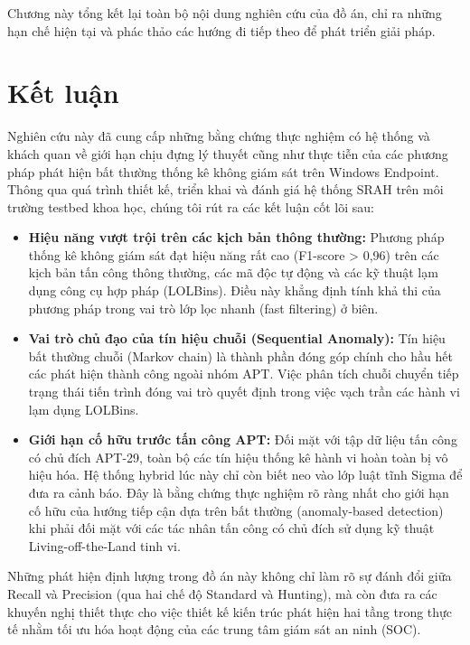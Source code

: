 \documentclass[../main.tex]{subfiles}
\begin{document}
Chương này tổng kết lại toàn bộ nội dung nghiên cứu của đồ án, chỉ ra những hạn chế hiện tại và phác thảo các hướng đi tiếp theo để phát triển giải pháp.

\section{Kết luận}
\label{section:conclusion.1}

Nghiên cứu này đã cung cấp những bằng chứng thực nghiệm có hệ thống và khách quan về giới hạn chịu đựng lý thuyết cũng như thực tiễn của các phương pháp phát hiện bất thường thống kê không giám sát trên Windows Endpoint. Thông qua quá trình thiết kế, triển khai và đánh giá hệ thống SRAH trên môi trường testbed khoa học, chúng tôi rút ra các kết luận cốt lõi sau:

\begin{itemize}
    \item \textbf{Hiệu năng vượt trội trên các kịch bản thông thường:} Phương pháp thống kê không giám sát đạt hiệu năng rất cao (F1-score > 0,96) trên các kịch bản tấn công thông thường, các mã độc tự động và các kỹ thuật lạm dụng công cụ hợp pháp (LOLBins). Điều này khẳng định tính khả thi của phương pháp trong vai trò lớp lọc nhanh (fast filtering) ở biên.
    \item \textbf{Vai trò chủ đạo của tín hiệu chuỗi (Sequential Anomaly):} Tín hiệu bất thường chuỗi (Markov chain) là thành phần đóng góp chính cho hầu hết các phát hiện thành công ngoài nhóm APT. Việc phân tích chuỗi chuyển tiếp trạng thái tiến trình đóng vai trò quyết định trong việc vạch trần các hành vi lạm dụng LOLBins.
    \item \textbf{Giới hạn cố hữu trước tấn công APT:} Đối mặt với tập dữ liệu tấn công có chủ đích APT-29, toàn bộ các tín hiệu thống kê hành vi hoàn toàn bị vô hiệu hóa. Hệ thống hybrid lúc này chỉ còn biết neo vào lớp luật tĩnh Sigma để đưa ra cảnh báo. Đây là bằng chứng thực nghiệm rõ ràng nhất cho giới hạn cố hữu của hướng tiếp cận dựa trên bất thường (anomaly-based detection) khi phải đối mặt với các tác nhân tấn công có chủ đích sử dụng kỹ thuật Living-off-the-Land tinh vi.
\end{itemize}

Những phát hiện định lượng trong đồ án này không chỉ làm rõ sự đánh đổi giữa Recall và Precision (qua hai chế độ Standard và Hunting), mà còn đưa ra các khuyến nghị thiết thực cho việc thiết kế kiến trúc phát hiện hai tầng trong thực tế nhằm tối ưu hóa hoạt động của các trung tâm giám sát an ninh (SOC).
\end{document}

